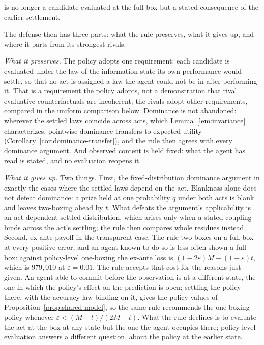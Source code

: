 is no longer a candidate evaluated at the full box but a stated consequence of the earlier settlement.

The defense then has three parts: what the rule preserves, what it gives up, and where it parts from its strongest rivals.

\textit{What it preserves.} The policy adopts one requirement: each candidate is evaluated under the law of the information state its own performance would settle, so that no act is assigned a law the agent could not be in after performing it. That is a requirement the policy adopts, not a demonstration that rival evaluative counterfactuals are incoherent; the rivals adopt other requirements, compared in the uniform comparison below. Dominance is not abandoned: wherever the settled laws coincide across acts, which Lemma~\ref{lem:invariance} characterizes, pointwise dominance transfers to expected utility (Corollary~\ref{cor:dominance-transfer}), and the rule then agrees with every dominance argument. And observed content is held fixed: what the agent has read is stated, and no evaluation reopens it.

\textit{What it gives up.} Two things. First, the fixed-distribution dominance argument in exactly the cases where the settled laws depend on the act. Blankness alone does not defeat dominance: a prize held at one probability $q$ under both acts is blank and leaves two-boxing ahead by $t$. What defeats the argument's applicability is an act-dependent settled distribution, which arises only when a stated coupling binds across the act's settling; the rule then compares whole residues instead. Second, ex-ante payoff in the transparent case. The rule two-boxes on a full box at every positive error, and an agent known to do so is less often shown a full box: against policy-level one-boxing the ex-ante loss is $(1 - 2\varepsilon)M - (1 - \varepsilon)t$, which is $979{,}010$ at $\varepsilon = 0.01$. The rule accepts that cost for the reasons just given. An agent able to commit before the observation is at a different state, the one in which the policy's effect on the prediction is open; settling the policy there, with the accuracy law binding on it, gives the policy values of Proposition~\ref{prop:shared-model}, so the same rule recommends the one-boxing policy whenever $\varepsilon < (M - t)/(2M - t)$. What the rule declines is to evaluate the act at the box at any state but the one the agent occupies there; policy-level evaluation answers a different question, about the policy at the earlier state.

